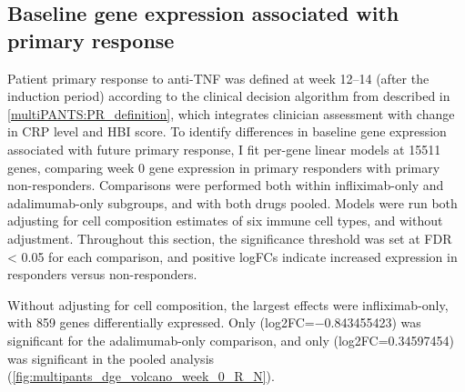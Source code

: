 

\subsection{Baseline gene expression associated with primary response}


Patient primary response to anti-\gls{TNF} was defined at week \numrange{12}{14} (after the induction period) according to the clinical decision algorithm from \textcite{kennedy2019PredictorsAntiTNFTreatment} described in \cref{multiPANTS:PR_definition}, 
which integrates clinician assessment with change in \gls{CRP} level and \gls{HBI} score.
To identify differences in baseline gene expression associated with future primary response, 
I fit per-gene linear models at 15511 genes, comparing week 0 gene expression in primary responders with primary non-responders.
Comparisons were performed both within infliximab-only and adalimumab-only subgroups, and with both drugs pooled.
Models were run both adjusting for cell composition estimates of six immune cell types, and without adjustment.
Throughout this section, the significance threshold was set at FDR < 0.05 for each comparison, and positive logFCs indicate increased expression in responders versus non-responders.

Without adjusting for cell composition, the largest effects were infliximab-only, with 859 genes differentially expressed.
Only  (log2FC=\num{-0.843455423}) was significant for the adalimumab-only comparison, 
and only  (log2FC=\num{0.34597454}) was significant in the pooled analysis (\cref{fig:multipants_dge_volcano_week_0_R_N}).

